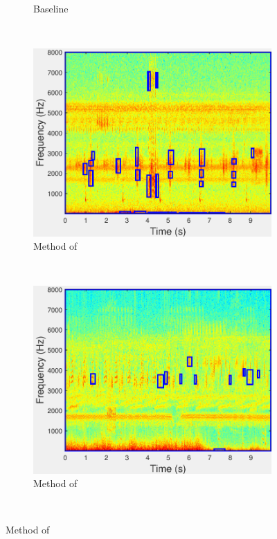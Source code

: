 \begin{figure}
\begin{subfigure}[b]{0.35\textwidth}
                \caption{Baseline}
        \end{subfigure}%
        \\          
        \begin{subfigure}[b]{0.35\textwidth}
                \includegraphics[width=\textwidth]{image/Ch7/AEDFodor.pdf}
                \caption{Method of \cite{fodor2013ninth}}
        \end{subfigure}%
                ~        
        \begin{subfigure}[b]{0.35\textwidth}
                \includegraphics[width=\textwidth]{image/Ch7/AEDFodor_2.pdf}
                \caption{Method of \cite{fodor2013ninth}}
        \end{subfigure}
\\


\end{figure}
